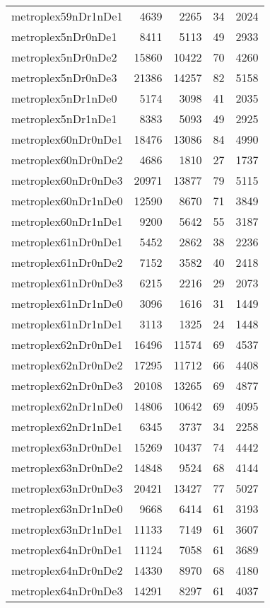 \begin{tabular}{lrrrr}
metroplex59nDr1nDe1 & 4639 & 2265 & 34 & 2024 \\
metroplex5nDr0nDe1 & 8411 & 5113 & 49 & 2933 \\
metroplex5nDr0nDe2 & 15860 & 10422 & 70 & 4260 \\
metroplex5nDr0nDe3 & 21386 & 14257 & 82 & 5158 \\
metroplex5nDr1nDe0 & 5174 & 3098 & 41 & 2035 \\
metroplex5nDr1nDe1 & 8383 & 5093 & 49 & 2925 \\
metroplex60nDr0nDe1 & 18476 & 13086 & 84 & 4990 \\
metroplex60nDr0nDe2 & 4686 & 1810 & 27 & 1737 \\
metroplex60nDr0nDe3 & 20971 & 13877 & 79 & 5115 \\
metroplex60nDr1nDe0 & 12590 & 8670 & 71 & 3849 \\
metroplex60nDr1nDe1 & 9200 & 5642 & 55 & 3187 \\
metroplex61nDr0nDe1 & 5452 & 2862 & 38 & 2236 \\
metroplex61nDr0nDe2 & 7152 & 3582 & 40 & 2418 \\
metroplex61nDr0nDe3 & 6215 & 2216 & 29 & 2073 \\
metroplex61nDr1nDe0 & 3096 & 1616 & 31 & 1449 \\
metroplex61nDr1nDe1 & 3113 & 1325 & 24 & 1448 \\
metroplex62nDr0nDe1 & 16496 & 11574 & 69 & 4537 \\
metroplex62nDr0nDe2 & 17295 & 11712 & 66 & 4408 \\
metroplex62nDr0nDe3 & 20108 & 13265 & 69 & 4877 \\
metroplex62nDr1nDe0 & 14806 & 10642 & 69 & 4095 \\
metroplex62nDr1nDe1 & 6345 & 3737 & 34 & 2258 \\
metroplex63nDr0nDe1 & 15269 & 10437 & 74 & 4442 \\
metroplex63nDr0nDe2 & 14848 & 9524 & 68 & 4144 \\
metroplex63nDr0nDe3 & 20421 & 13427 & 77 & 5027 \\
metroplex63nDr1nDe0 & 9668 & 6414 & 61 & 3193 \\
metroplex63nDr1nDe1 & 11133 & 7149 & 61 & 3607 \\
metroplex64nDr0nDe1 & 11124 & 7058 & 61 & 3689 \\
metroplex64nDr0nDe2 & 14330 & 8970 & 68 & 4180 \\
metroplex64nDr0nDe3 & 14291 & 8297 & 61 & 4037 \\

\end{tabular}

